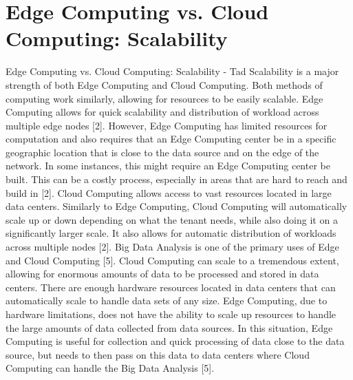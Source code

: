 \documentclass[conference]{IEEEtran}
\begin{document}
{\section{Edge Computing vs. Cloud Computing: Scalability}
Edge Computing vs. Cloud Computing: Scalability - Tad
Scalability is a major strength of both Edge Computing and Cloud Computing. Both methods of computing work similarly, allowing for resources to be easily scalable. Edge Computing allows for quick scalability and distribution of workload across multiple edge nodes [2]. However, Edge Computing has limited resources for computation and also requires that an Edge Computing center be in a specific geographic location that is close to the data source and on the edge of the network. In some instances, this might require an Edge Computing center be built. This can be a costly process, especially in areas that are hard to reach and build in [2]. Cloud Computing allows access to vast resources located in large data centers. Similarly to Edge Computing, Cloud Computing will automatically scale up or down depending on what the tenant needs, while also doing it on a significantly larger scale. It also allows for automatic distribution of workloads across multiple nodes [2].
Big Data Analysis is one of the primary uses of Edge and Cloud Computing [5]. Cloud Computing can scale to a tremendous extent, allowing for enormous amounts of data to be processed and stored in data centers. There are enough hardware resources located in data centers that can automatically scale to handle data sets of any size. Edge Computing, due to hardware limitations, does not have the ability to scale up resources to handle the large amounts of data collected from data sources. In this situation, Edge Computing is useful for collection and quick processing of data close to the data source, but needs to then pass on this data to data centers where Cloud Computing can handle the Big Data Analysis [5].

}
\end{document}
